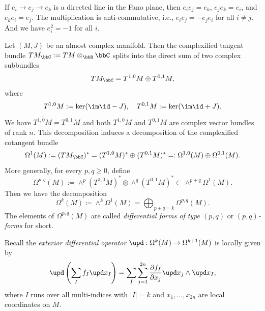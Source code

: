 \begin{remark}
\begin{enumerate}
\begin{center}
		      \end{center}
		      If \(e_i \to e_j \to e_k\) is a directed line in the Fano plane, then \(e_i e_j = e_k\), \(e_j e_k = e_i\), and \(e_k e_i = e_j\).
		      The multiplication is anti-commutative, i.e., \(e_i e_j = - e_j e_i\) for all \(i\neq j\).
		      And we have \(e_i^2 = -1\) for all \(i\).
	\end{enumerate}
\end{remark}

Let \((M,J)\) be an almost complex manifold.
Then the complexified tangent bundle \(TM_\bbC  := TM \otimes_\bbR \bbC\) splits into the direct sum of two complex subbundles
\[ T M_\bbC = T^{1,0}M \oplus T^{0,1}M, \]
where
\[ T^{1,0}M := \ker (\im \id - J), \quad T^{0,1}M := \ker (\im \id + J). \]
We have \(\overline{T^{1,0}M} = T^{0,1}M\) and both \(T^{1,0}M\) and \(T^{0,1}M\) are complex vector bundles of rank \(n\).
This decomposition induces a decomposition of the complexified cotangent bundle
\[ \Omega^1(M) := (TM_\bbC)^* = (T^{1,0}M)^* \oplus (T^{0,1}M)^* =: \Omega^{1,0}(M) \oplus \Omega^{0,1}(M). \]
More generally, for every \(p,q \geq 0\), define
\[ \Omega^{p,q}(M) := \wedge^p (T^{1,0}M)^* \otimes \wedge^q (T^{0,1}M)^* \subset \wedge^{p+q} \Omega^1(M). \]
Then we have the decomposition
\[ \Omega^k(M) \coloneqq \wedge^k \Omega^1(M) = \bigoplus_{p+q=k} \Omega^{p,q}(M). \]
The elements of \(\Omega^{p,q}(M)\) are called \emph{differential forms of type \((p,q)\)} or \emph{\((p,q)\)-forms} for short.

Recall the \emph{exterior differential operator} \(\upd:\Omega^k(M) \to \Omega^{k+1}(M)\) is locally given by
\[ \upd\left(\sum_I f_I \upd x_I\right) = \sum_I \sum_{j=1}^{2n} \frac{\partial f_I}{\partial x_j} \upd x_j \wedge \upd x_I, \]
where \(I\) runs over all multi-indices with \(|I| = k\) and \(x_1, \ldots, x_{2n}\) are local coordinates on \(M\).

